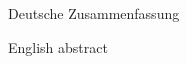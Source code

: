 \thispagestyle{empty}
\begin{abstr}
Deutsche Zusammenfassung
\end{abstr}


\begin{abstr}
English abstract
\end{abstr}
